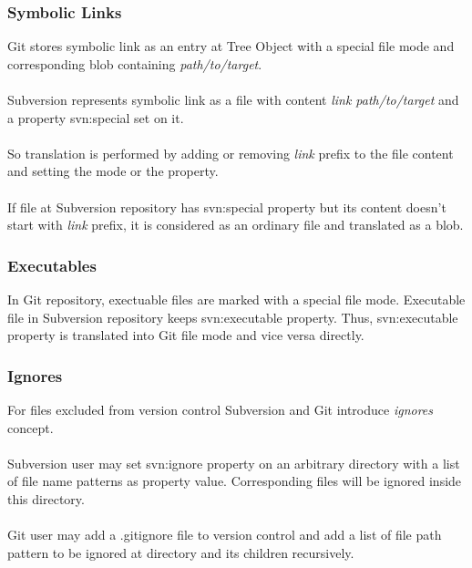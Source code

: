 \subsubsection{Symbolic Links}
Git stores symbolic link as an entry at Tree Object with a special file mode and corresponding blob containing \emph{path/to/target}.
\\\\
Subversion represents symbolic link as a file with content \emph{link path/to/target} and a property svn:special set on it.
\\\\
So translation is performed by adding or removing \emph{link } prefix to the file content and setting the mode or the property.
\\\\
If file at Subversion repository has svn:special property but its content doesn't start with \emph{link } prefix, it is considered as an ordinary file and translated as a blob.
\subsubsection{Executables}
In Git repository, exectuable files are marked with a special file mode. Executable file in Subversion repository keeps svn:executable property. 
Thus, svn:executable property is translated into Git file mode and vice versa directly.
\subsubsection{Ignores}

For files excluded from version control Subversion and Git introduce \emph{ignores} concept.
\\\\
Subversion user may set svn:ignore property on an arbitrary directory with a list of file name patterns as property value. Corresponding files will be ignored inside this directory.
\\\\
Git user may add a .gitignore file to version control and add a list of file path pattern to be ignored at directory and its children recursively.

